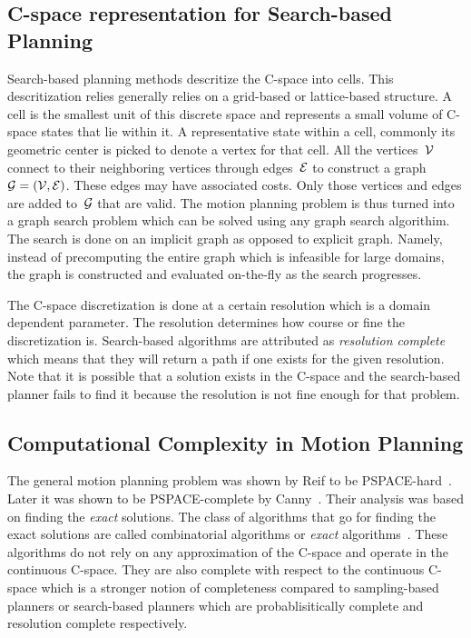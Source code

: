 \documentclass[a4paper,10pt]{article}
\begin{document}
\subsection{C-space representation for Search-based Planning}
\label{sec:sbp}
Search-based planning methods descritize the C-space into cells. This descritization relies generally relies on a grid-based or lattice-based structure. A cell is the smallest unit of this discrete space and represents a small volume of C-space states that lie within it. A representative state within a cell, commonly its geometric center is picked to denote a vertex for that cell. All the vertices~$\mathcal{V}$ connect to their neighboring vertices through edges~$\mathcal{E}$ to construct a graph~$\mathcal{G} = (\mathcal{V}, \mathcal{E})$. These edges may have associated costs. Only those vertices and edges are added to~$\mathcal{G}$ that are valid. The motion planning problem is thus turned into a graph search problem which can be solved using any graph search algorithim. The search is done on an implicit graph as opposed to explicit graph. Namely, instead of precomputing the entire graph which is infeasible for large domains, the graph is constructed and evaluated on-the-fly as the search progresses.

The C-space discretization is done at a certain resolution which is a domain dependent parameter. The resolution determines how course or fine the discretization is. Search-based algorithms are attributed as \emph{resolution complete} which means that they will return a path if one exists for the given resolution. Note that it is possible that a solution exists in the C-space and the search-based planner fails to find it because the resolution is not fine enough for that problem.

\subsection{Computational Complexity in Motion Planning}
The general motion planning problem was shown by Reif to be PSPACE-hard~\cite{reif1979complexity}. Later it was shown to be PSPACE-complete by Canny~\cite{canny1988complexity}. Their analysis was based on finding the \emph{exact} solutions. The class of algorithms that go for finding the exact solutions are called combinatorial algorithms or \emph{exact} algorithms~\cite{lavalle2006planning}. These algorithms do not rely on any approximation of the C-space and operate in the continuous C-space. They are also complete with respect to the continuous C-space which is a stronger notion of completeness compared to sampling-based planners or search-based planners which are probablisitically complete and resolution complete respectively.
\end{document}
